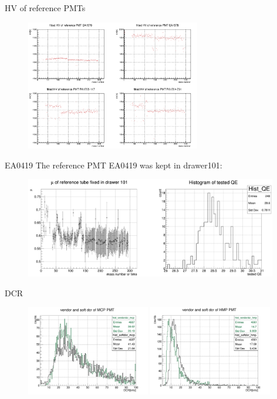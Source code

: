 \documentclass[11pt,compress,xcolor=x11names,UTF8]{beamer}
\begin{document}
\begin{frame}{HV of reference PMTs}
\begin{figure}
\centering
\includegraphics[width=0.68\textwidth]{ref_HV_sta}
\end{figure}
\end{frame}
\begin{frame}{EA0419}
The reference PMT EA0419 was kept in drawer101:
\begin{figure}
\centering
\includegraphics[width=0.98\textwidth]{101_sta}
\end{figure}
\end{frame}
\begin{frame}{DCR}
\begin{figure}
\centering
\includegraphics[width=0.48\textwidth]{vendordcr_mcp}
\includegraphics[width=0.48\textwidth]{vendordcr_hmp}
\end{figure}
\end{frame}
\end{document}
